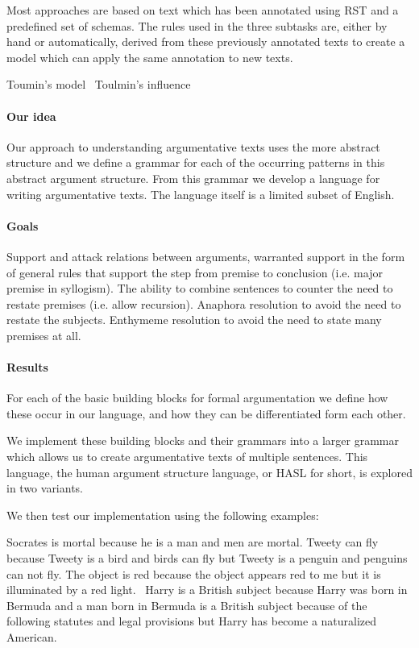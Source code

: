 \documentclass{IOS-Book-Article}
\begin{document}
Most approaches are based on text which has been annotated using RST and a predefined set of schemas. The rules used in the three subtasks are, either by hand or automatically, derived from these previously annotated texts to create a model which can apply the same annotation to new texts.



Toumin's model~\cite{toulmin1958}
Toulmin's influence~\cite{verheij2009}

\paragraph{Our idea}
Our approach to understanding argumentative texts uses the more abstract structure \cite{peldszus2013argument} and we define a grammar for each of the occurring patterns in this abstract argument structure. From this grammar we develop a language for writing argumentative texts. The language itself is a limited subset of English.

\paragraph{Goals}
Support and attack relations between arguments, warranted support in the form of general rules that support the step from premise to conclusion (i.e. major premise in syllogism). The ability to combine sentences to counter the need to restate premises (i.e. allow recursion). Anaphora resolution to avoid the need to restate the subjects. Enthymeme resolution to avoid the need to state many premises at all. 

\paragraph{Results}
For each of the basic building blocks for formal argumentation we define how these occur in our language, and how they can be differentiated form each other.

We implement these building blocks and their grammars into a larger grammar which allows us to create argumentative texts of multiple sentences. This language, the human argument structure language, or HASL for short, is explored in two variants.

We then test our implementation using the following examples:
\begin{exe}
	\ex\label{ex:socrates} Socrates is mortal because he is a man and men are mortal.
	\ex\label{ex:tweety} Tweety can fly because Tweety is a bird and birds can fly but Tweety is a penguin and penguins can not fly.
	\ex\label{ex:light} The object is red because the object appears red to me but it is illuminated by a red light.~\cite{pollock1987}
	\ex\label{ex:toulmin} Harry is a British subject because Harry was born in Bermuda and a man born in Bermuda is a British subject because of the following statutes and legal provisions but Harry has become a naturalized American.~\cite{toulmin1958}
\end{exe}
\end{document}
